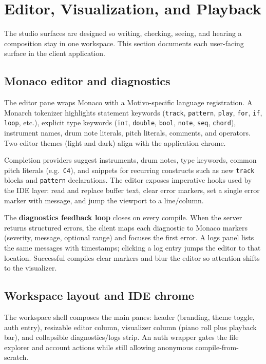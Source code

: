 \section{Editor, Visualization, and Playback}\label{sec:editor-visualization}

The studio surfaces are designed so writing, checking, seeing, and hearing a composition stay in one workspace.
This section documents each user-facing surface in the client application.

\subsection{Monaco editor and diagnostics}\label{subsec:monaco-editor}

The editor pane wraps Monaco with a Motivo-specific language registration.
A Monarch tokenizer highlights statement keywords (\texttt{track}, \texttt{pattern}, \texttt{play}, \texttt{for},
\texttt{if}, \texttt{loop}, etc.), explicit type keywords (\texttt{int}, \texttt{double}, \texttt{bool},
\texttt{note}, \texttt{seq}, \texttt{chord}), instrument names, drum note literals, pitch literals, comments, and
operators.
Two editor themes (light and dark) align with the application chrome.

Completion providers suggest instruments, drum notes, type keywords, common pitch literals (e.g.\ \texttt{C4}),
and snippets for recurring constructs such as new \texttt{track} blocks and \texttt{pattern} declarations.
The editor exposes imperative hooks used by the IDE layer: read and replace buffer text, clear error markers, set a
single error marker with message, and jump the viewport to a line/column.

The \textbf{diagnostics feedback loop} closes on every compile.
When the server returns structured errors, the client maps each diagnostic to Monaco markers (severity, message,
optional range) and focuses the first error.
A logs panel lists the same messages with timestamps; clicking a log entry jumps the editor to that location.
Successful compiles clear markers and blur the editor so attention shifts to the visualizer.

\subsection{Workspace layout and IDE chrome}\label{subsec:ide-workspace}

The workspace shell composes the main panes: header (branding, theme toggle, auth entry), resizable editor column,
visualizer column (piano roll plus playback bar), and collapsible diagnostics/logs strip.
An auth wrapper gates the file explorer and account actions while still allowing anonymous compile-from-scratch.

